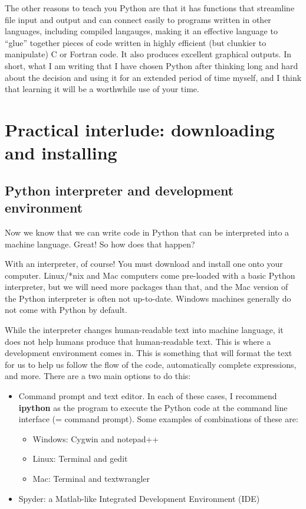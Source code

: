 \documentclass[a4paper,10pt]{amsart}
\begin{document}
The other reasons to teach you Python are that it has functions that streamline file input and output and can connect easily to programs written in other languages, including compiled langauges, making it an effective language to ``glue'' together pieces of code written in highly efficient (but clunkier to manipulate) C or Fortran code. It also produces excellent graphical outputs. In short, what I am writing that I have chosen Python after thinking long and hard about the decision and using it for an extended period of time myself, and I think that learning it will be a worthwhile use of your time.

\section{Practical interlude: downloading and installing}

\subsection{Python interpreter and development environment}

Now we know that we can write code in Python that can be interpreted into a machine language. Great! So how does that happen?

With an interpreter, of course! You must download and install one onto your computer. Linux/*nix and Mac computers come pre-loaded with a basic Python interpreter, but we will need more packages than that, and the Mac version of the Python interpreter is often not up-to-date. Windows machines generally do not come with Python by default.

While the interpreter changes human-readable text into machine language, it does not help humans produce that human-readable text. This is where a development environment comes in. This is something that will format the text for us to help us follow the flow of the code, automatically complete expressions, and more. There are a two main options to do this:

\begin{itemize}
 \item Command prompt and text editor. In each of these cases, I recommend \textbf{ipython} as the program to execute the Python code at the command line interface (= command prompt). Some examples of combinations of these are:
 \begin{itemize}
  \item Windows: Cygwin and notepad++
  \item Linux: Terminal and gedit
  \item Mac: Terminal and textwrangler
 \end{itemize}
 \item Spyder: a Matlab-like Integrated Development Environment (IDE)
\end{itemize}
\end{document}
